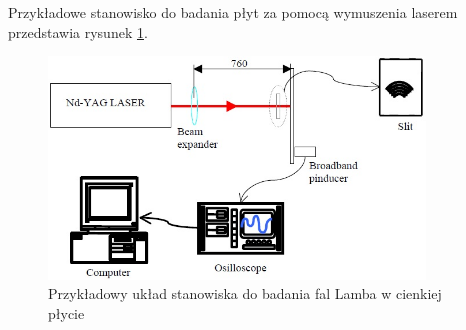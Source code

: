 Przykładowe stanowisko do badania płyt za pomocą wymuszenia laserem przedstawia rysunek \ref{fig:laser}.

\begin{figure}[h]
\centering
\includegraphics[width=10cm]{Zdjecia/2/laser}
\caption{Przykładowy układ stanowiska do badania fal Lamba w cienkiej płycie}
\label{fig:laser}
\end{figure}